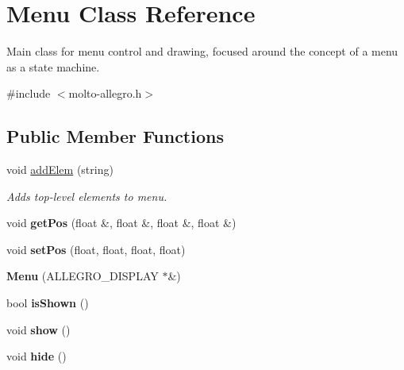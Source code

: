 \hypertarget{classMenu}{\section{Menu Class Reference}
\label{classMenu}
}


Main class for menu control and drawing, focused around the concept of a menu as a state machine.  




{\ttfamily \#include $<$molto-\/allegro.\-h$>$}

\subsection*{Public Member Functions}
\begin{DoxyCompactItemize}
\item 
void \hyperlink{classMenu_a972a89c0d3601b0dc1894b9ead61a040}{add\-Elem} (string)
\begin{DoxyCompactList}\small\item\em Adds top-\/level elements to menu. \end{DoxyCompactList}\item 
\hypertarget{classMenu_af73bc84bf1d4aad04741acccfb02d4c2}{void {\bfseries get\-Pos} (float \&, float \&, float \&, float \&)}\label{classMenu_af73bc84bf1d4aad04741acccfb02d4c2}

\item 
\hypertarget{classMenu_a169657b662ee3e565273de56916d4bc2}{void {\bfseries set\-Pos} (float, float, float, float)}\label{classMenu_a169657b662ee3e565273de56916d4bc2}

\item 
\hypertarget{classMenu_a874c7ad27dc60ee1c7a1dba967eb862a}{{\bfseries Menu} (A\-L\-L\-E\-G\-R\-O\-\_\-\-D\-I\-S\-P\-L\-A\-Y $\ast$\&)}\label{classMenu_a874c7ad27dc60ee1c7a1dba967eb862a}

\item 
\hypertarget{classMenu_a3221e5f2d774d39ddcb39ee1202f547e}{bool {\bfseries is\-Shown} ()}\label{classMenu_a3221e5f2d774d39ddcb39ee1202f547e}

\item 
\hypertarget{classMenu_a0abab4548ebff1187c3a91b95d2cc04e}{void {\bfseries show} ()}\label{classMenu_a0abab4548ebff1187c3a91b95d2cc04e}

\item 
\hypertarget{classMenu_a8061d90f02167fb3610b6b277ef3f88b}{void {\bfseries hide} ()}\label{classMenu_a8061d90f02167fb3610b6b277ef3f88b}


\end{DoxyCompactItemize}
